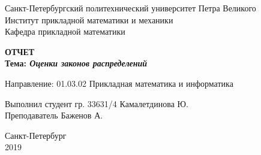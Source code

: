 \begin{titlepage}

\begin{center}
Санкт-Петербургский политехнический университет Петра Великого\\
Институт прикладной математики и механики\\
Кафедра прикладной математики\\
\end{center}


\vspace{2.5cm}

\begin{center}
{\large {\bfseries ОТЧЕТ}}\\

\bigskip \bfseries{Тема:} {\bfseries \emph{Оценки законов распределений}}
\end{center}

\vspace{1.5cm}

\begin{flushleft}
Направление: 01.03.02 Прикладная математика и информатика

\vspace{1.5cm}

Выполнил студент гр. 33631/4 \hfill{Камалетдинова Ю.} \\ 

\vspace{0.5cm} Преподаватель \hfill{Баженов А.}
\vspace{1cm}

\end{flushleft}

\vspace{2.7cm}

\begin{center}
Санкт-Петербург\\
2019
\end{center}

\end{titlepage}

